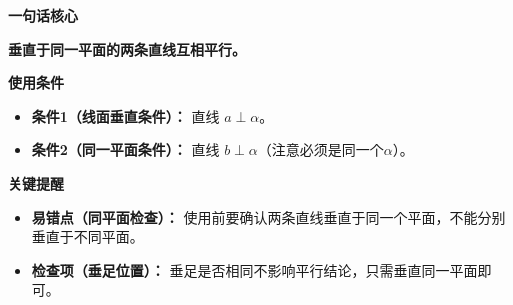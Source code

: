 \begin{summarybox}
	\textbf{\textcolor{CSummary}{一句话核心}}

	\textbf{垂直于同一平面的两条直线互相平行。}

	\medskip
	\textbf{\textcolor{CSummary}{使用条件}}
	\begin{itemize}[leftmargin=*, itemsep=0.5em, topsep=0.4em]
		\item \textbf{条件1（线面垂直条件）：} 直线 $a\perp\alpha$。
		\item \textbf{条件2（同一平面条件）：} 直线 $b\perp\alpha$（注意必须是同一个$\alpha$）。
	\end{itemize}

	\medskip
	\textbf{\textcolor{CSummary}{关键提醒}}
	\begin{itemize}[leftmargin=*, itemsep=0.5em, topsep=0.4em]
		\item \textbf{易错点（同平面检查）：} 使用前要确认两条直线垂直于同一个平面，不能分别垂直于不同平面。
		\item \textbf{检查项（垂足位置）：} 垂足是否相同不影响平行结论，只需垂直同一平面即可。
	\end{itemize}
\end{summarybox}
